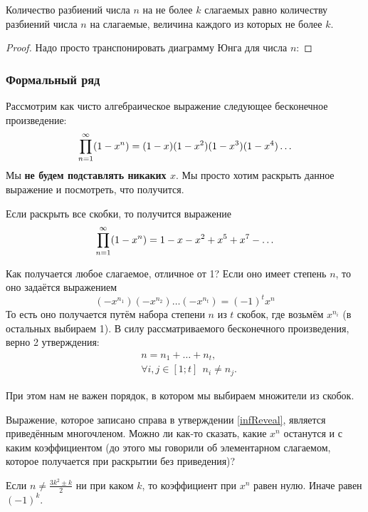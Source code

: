 \begin{theorem}
	Количество разбиений числа $n$ на не более $k$ слагаемых равно количеству разбиений числа $n$ на слагаемые, величина каждого из которых не более $k$.
\end{theorem}

\begin{proof}
	Надо просто транспонировать диаграмму Юнга для числа $n$:
\end{proof}

\subsubsection*{Формальный ряд}

Рассмотрим как чисто алгебраическое выражение следующее бесконечное произведение:
\[
	\prod\limits_{n = 1}^\infty (1 - x^n) = (1 - x)(1 - x^2)(1 - x^3)(1 - x^4)\ldots
\]
Мы \textbf{не будем подставлять никаких $x$}. Мы просто хотим раскрыть данное выражение и посмотреть, что получится.

\begin{proposition} \label{infReveal}
	Если раскрыть все скобки, то получится выражение
	\[
		\prod\limits_{n = 1}^\infty (1 - x^n) = 1 - x - x^2 + x^5 + x^ 7 - \ldots
	\]
\end{proposition}

Как получается любое слагаемое, отличное от 1? Если оно имеет степень $n$, то оно задаётся выражением
\[
	(-x^{n_1})(-x^{n_2})\ldots(-x^{n_t}) = (-1)^t x^n
\]
То есть оно получается путём набора степени $n$ из $t$ скобок, где возьмём $x^{n_i}$ (в остальных выбираем 1). В силу рассматриваемого бесконечного произведения, верно 2 утверждения:
\begin{align*}
	&n = n_1 + \ldots + n_t,
	\\
	&\forall i, j \in [1; t]\ \ n_i \neq n_j.
\end{align*}

При этом нам не важен порядок, в котором мы выбираем множители из скобок.

Выражение, которое записано справа в утверждении \ref{infReveal}, является приведённым многочленом. Можно ли как-то сказать, какие $x^n$ останутся и с каким коэффициентом (до этого мы говорили об элементарном слагаемом, которое получается при раскрытии без приведения)?

\begin{theorem}
	Если $n \neq \frac{3k^2 \pm k}{2}$ ни при каком $k$, то коэффициент при $x^n$ равен нулю. Иначе равен $(-1)^k$.
\end{theorem}


